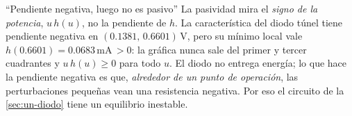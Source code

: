 \begin{trampa}[label=tr:pa-pendiente]{``Pendiente negativa, luego no es pasivo''}
La pasividad mira el \emph{signo de la potencia}, $u\,h(u)$, no la pendiente de $h$. La característica del diodo túnel tiene pendiente negativa en $(0.1381,\,0.6601)$\,V, pero su mínimo local vale $h(0.6601)=0.0683$\,mA$\,>0$: la gráfica nunca sale del primer y tercer cuadrantes y $u\,h(u)\ge0$ para todo $u$. El diodo no entrega energía; lo que hace la pendiente negativa es que, \emph{alrededor de un punto de operación}, las perturbaciones pequeñas vean una resistencia negativa. Por eso el circuito de la \cref{sec:un-diodo} tiene un equilibrio inestable.
\end{trampa}

